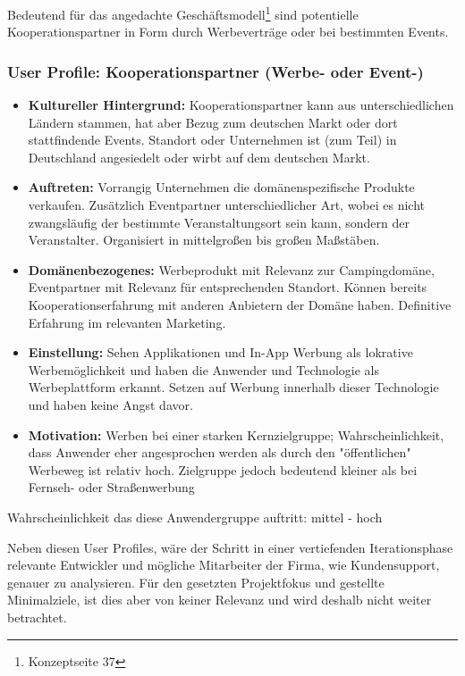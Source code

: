 \newpage
Bedeutend für das angedachte Geschäftsmodell\footnote{Konzeptseite 37} sind potentielle Kooperationspartner in Form durch Werbeverträge oder bei bestimmten Events.

\subsubsection{User Profile: Kooperationspartner (Werbe- oder Event-)}
\begin{itemize}
   \item 
   \textbf{Kultureller Hintergrund:} Kooperationspartner kann aus unterschiedlichen Ländern stammen, hat aber Bezug zum deutschen Markt oder dort stattfindende Events. Standort oder Unternehmen ist (zum Teil) in Deutschland angesiedelt oder wirbt auf dem deutschen Markt.

   \item
   \textbf{Auftreten:} Vorrangig Unternehmen die domänenspezifische Produkte verkaufen. Zusätzlich Eventpartner unterschiedlicher Art, wobei es nicht zwangsläufig der bestimmte Veranstaltungsort sein kann, sondern der Veranstalter. Organisiert in mittelgroßen bis großen Maßstäben.

   \item 
   \textbf{Domänenbezogenes:} Werbeprodukt mit Relevanz zur Campingdomäne, Eventpartner mit Relevanz für entsprechenden Standort. Können bereits Kooperationserfahrung mit anderen Anbietern der Domäne haben. Definitive Erfahrung im relevanten Marketing.

   \item
   \textbf{Einstellung:} Sehen Applikationen und In-App Werbung als lokrative Werbemöglichkeit und haben die Anwender und Technologie als Werbeplattform erkannt. Setzen auf Werbung innerhalb dieser Technologie und haben keine Angst davor.

   \item
   \textbf{Motivation:} Werben bei einer starken Kernzielgruppe; Wahrscheinlichkeit, dass Anwender eher angesprochen werden als durch den "öffentlichen" Werbeweg ist relativ hoch. Zielgruppe jedoch bedeutend kleiner als bei Fernseh- oder Straßenwerbung
   
\end{itemize}
Wahrscheinlichkeit das diese Anwendergruppe auftritt: mittel - hoch

Neben diesen User Profiles, wäre der Schritt in einer vertiefenden Iterationsphase relevante Entwickler und mögliche Mitarbeiter der Firma, wie Kundensupport, genauer zu analysieren. Für den gesetzten Projektfokus und gestellte Minimalziele, ist dies aber von keiner Relevanz und wird deshalb nicht weiter betrachtet.\\



